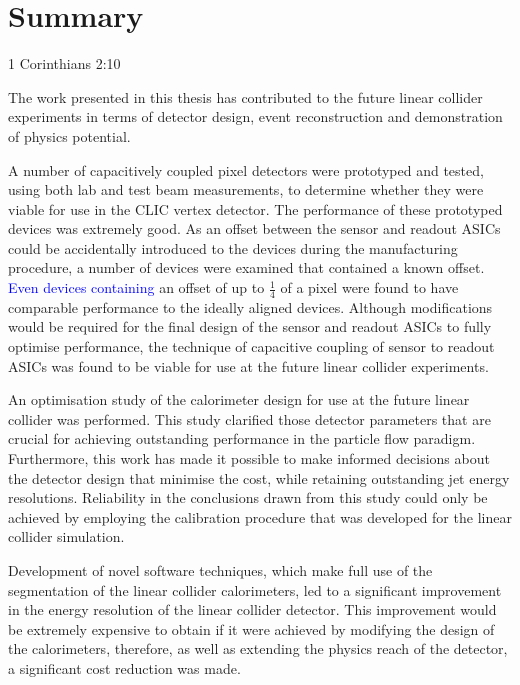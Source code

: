 \chapter{Summary}
\label{chap:summary}

{1 Corinthians 2:10}



The work presented in this thesis has contributed to the future linear collider experiments in terms of detector design, event reconstruction and demonstration of physics potential.  

A number of capacitively coupled pixel detectors were prototyped and tested, using both lab and test beam measurements, to determine whether they were viable for use in the CLIC vertex detector.  The performance of these prototyped devices was extremely good.  As an offset between the sensor and readout ASICs could be accidentally introduced to the devices during the manufacturing procedure, a number of devices were examined that contained a known offset.  \textcolor{blue}{Even devices containing} an offset of up to $\frac{1}{4}$ of a pixel were found to have comparable performance to the ideally aligned devices.  Although modifications would be required for the final design of the sensor and readout ASICs to fully optimise performance, the technique of capacitive coupling of sensor to readout ASICs was found to be viable for use at the future linear collider experiments.  

An optimisation study of the calorimeter design for use at the future linear collider was performed.  This study clarified those detector parameters that are crucial for achieving outstanding performance in the particle flow paradigm.  Furthermore, this work has made it possible to make informed decisions about the detector design that minimise the cost, while retaining outstanding jet energy resolutions.  Reliability in the conclusions drawn from this study could only be achieved by employing the calibration procedure that was developed for the linear collider simulation.  

Development of novel software techniques, which make full use of the segmentation of the linear collider calorimeters, led to a significant improvement in the energy resolution of the linear collider detector.  This improvement would be extremely expensive to obtain if it were achieved by modifying the design of the calorimeters, therefore, as well as extending the physics reach of the detector, a significant cost reduction was made.   


